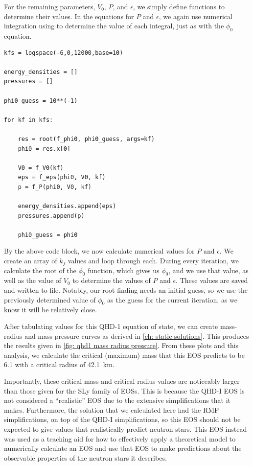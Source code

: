 For the remaining parameters, $V_0$, $P$, and $\epsilon$, we simply define functions to determine their values. In the equations for $P$ and $\epsilon$, we again use numerical integration using  to determine the value of each integral, just as with the $\phi_0$ equation.

\begin{lstlisting}
kfs = logspace(-6,0,12000,base=10)

energy_densities = []
pressures = []

phi0_guess = 10**(-1)

for kf in kfs:

    res = root(f_phi0, phi0_guess, args=kf)
    phi0 = res.x[0]

    V0 = f_V0(kf)
    eps = f_eps(phi0, V0, kf)
    p = f_P(phi0, V0, kf)

    energy_densities.append(eps)
    pressures.append(p)

    phi0_guess = phi0
\end{lstlisting}

By the above code block, we now calculate numerical values for $P$ and $\epsilon$. We create an array of $k_f$ values and loop through each. During every iteration, we calculate the root of the $\phi_0$ function, which gives us $\phi_0$, and we use that value, as well as the value of $V_0$ to determine the values of $P$ and $\epsilon$.  These values are saved and written to file. Notably, our root finding needs an initial guess, so we use the previously determined value of $\phi_0$ as the guess for the current iteration, as we know it will be relatively close.

After tabulating values for this QHD-1 equation of state, we can create mass-radius and mass-pressure curves as derived in \autoref{ch: static solutions}. This produces the results given in \autoref{fig: qhd1 mass radius pressure}. From these plots and this analysis, we calculate the critical (maximum) mass that this EOS predicts to be \SI{6.1}{\odot} with a critical radius of \SI{42.1}{km}. 

Importantly, these critical mass and critical radius values are noticeably larger than those given for the SLy family of EOSs. This is because the QHD-I EOS is not considered a ``realistic'' EOS due to the extensive simplifications that it makes. Furthermore, the solution that we calculated here had the RMF simplifications, on top of the QHD-I simplifications, so this EOS should not be expected to give values that realistically predict neutron stars. This EOS instead was used as a teaching aid for how to effectively apply a theoretical model to numerically calculate an EOS and use that EOS to make predictions about the observable properties of the neutron stars it describes.
